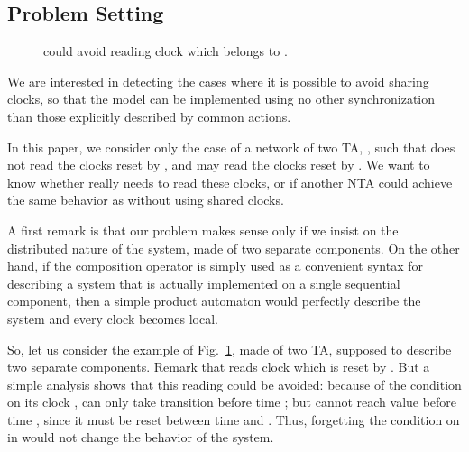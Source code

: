 \documentclass{LMCS}
\theoremstyle{plain}\newtheorem*{prop11}{Proposition~\ref{prop:states} bis}
\begin{document}
\subsection{Problem Setting}
\begin{figure}[t]
  \centering
  \caption{ could avoid reading clock  which belongs to .}
  \label{fig:example0}
\end{figure}
We are interested in detecting the cases where it is possible to avoid sharing
clocks, so that the model can be implemented using no other synchronization than
those explicitly described by common actions.

In this paper, we consider only the case of a network of two TA, , such that  does not read the clocks reset by , and 
may read the clocks reset by .
We want to know whether  really needs to read these clocks,
or if another NTA  could achieve the same
behavior as  without using shared clocks.

A first remark is that our problem makes sense only if we insist on the
distributed nature of the system, made of two separate components. On the other
hand, if the composition operator is simply used as a convenient syntax for
describing a system that is actually implemented on a single sequential
component, then a simple product automaton would perfectly describe the system
and every clock becomes local.

So, let us consider the example of Fig.~\ref{fig:example0}, made of two TA,
supposed to describe two separate components. Remark that  reads clock
 which is reset by . But a simple analysis shows that this reading
could be avoided: because of the condition on its clock ,  can only
take transition  before time ; but  cannot reach value 
before time , since it must be reset between time  and .
Thus, forgetting the condition on  in  would not change the
behavior of the system.
\end{document}
